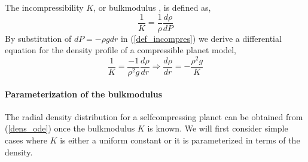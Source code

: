 The incompressibility $K$, or bulkmodulus
, is defined as,
\begin{equation}
   \frac{1}{K} = \frac{1}{\rho} \frac{d\rho}{dP}
\label{def_incompres}
\end{equation}
By substitution of $dP = - \rho g dr$ in (\ref{def_incompres}) 
we derive a differential equation for the density profile
of a compressible planet model,
\begin{equation}
  \frac{1}{K} = \frac{-1}{\rho^2 g} \frac{d\rho}{dr}
    \Rightarrow 
  \frac{d\rho}{dr} = - \frac{\rho^2 g}{K}
\label{dens_ode}
\end{equation}

\paragraph{Parameterization of the bulkmodulus}
The radial density distribution for a selfcompressing planet can be 
obtained from (\ref{dens_ode}) once the bulkmodulus $K$ is known.
We will first consider simple cases where $K$ is either a uniform
constant or it is parameterized in terms of the density.


